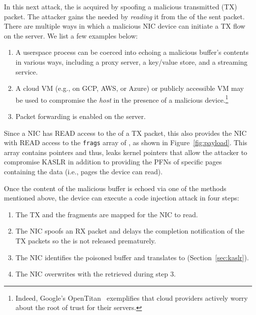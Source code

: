 In this next attack, the \kva is acquired by spoofing a malicious transmitted (TX) packet. The attacker gains the needed \kva by \emph{reading} it from the \shinfo of the sent packet. 
%
There are multiple ways in which a malicious NIC device can initiate a TX flow on the server. We list a few examples below:
\begin{enumerate}
    \item A userspace process can be coerced into echoing a malicious buffer's contents in various ways, including a proxy server, a key/value store, and a streaming service.
    \item A cloud VM (e.g., on GCP, AWS, or Azure) or publicly accessible VM may be used to compromise the \emph{host} in the presence of a malicious device.\footnote{Indeed, Google's OpenTitan~\cite{opentitan} exemplifies that cloud providers actively worry about the root of trust for their servers.}
    \item Packet forwarding is enabled on the server.
\end{enumerate}
Since a NIC has READ access to the \shinfo{} of a TX packet, this also provides the NIC with READ access to the \texttt{frags} array of \shinfo{}, as shown in Figure~\ref{fig:payload}. This array contains \page{} pointers and thus, leaks kernel pointers that allow the attacker to compromise KASLR in addition to providing the PFNs of specific pages containing the data (i.e., pages the device can read).


Once the content of the malicious buffer is echoed via one of the methods mentioned above, the device can execute a code injection attack in four steps:  
%
\begin{enumerate}[labelindent=3pt]
    \item The TX \data{} and the fragments are mapped for the NIC to read.
    \item The NIC spoofs an RX packet and delays the completion notification of the TX packets so the \mabaf{} is not  released prematurely.
    \item The NIC identifies the poisoned buffer and translates \page{} to \kva{} (Section~\ref{sec:kaslr}).
    \item The NIC overwrites \shinfo{} with the \kva{} retrieved during step 3. 
\end{enumerate}


